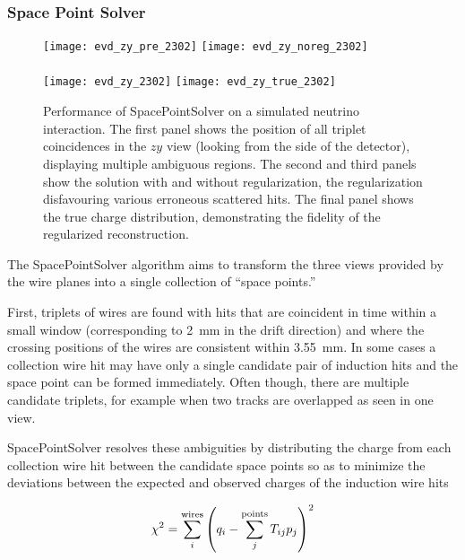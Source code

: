\subsubsection{Space Point Solver}

\begin{figure}
\texttt{[image: evd\_zy\_pre\_2302]}
\texttt{[image: evd\_zy\_noreg\_2302]}\\
\\
\texttt{[image: evd\_zy\_2302]}
\texttt{[image: evd\_zy\_true\_2302]}
\\

\caption[Event displays of SpacePointSolver performance]{Performance of SpacePointSolver on a simulated  neutrino interaction. The first panel shows the position of all triplet coincidences in the $zy$ view (looking from the side of the detector), displaying multiple ambiguous regions. The second and third panels show the solution with and without regularization, the regularization disfavouring various erroneous scattered hits. The final panel shows the true charge distribution, demonstrating %
the fidelity of the regularized reconstruction.}

\label{fig:spacepoint}
\end{figure}

The SpacePointSolver algorithm aims to transform the three \twod views provided by the wire planes into a single collection of \threed ``space points.''

First, triplets of wires are found with hits that are coincident in time within a small window (corresponding to \SI{2}{mm} in the drift direction) and where the crossing positions of the wires are consistent within \SI{3.55}{mm}. In some cases a collection wire hit may have only a single candidate pair of induction hits and the space point can be formed immediately. Often though, there are multiple candidate triplets, for example when two tracks are overlapped as seen in one view.

SpacePointSolver resolves these ambiguities by distributing the charge from each collection wire hit between the candidate space points so as to minimize the deviations between the expected and observed charges of the induction wire hits

\begin{equation}
\chi^2 = \sum_i^{\rm wires} \left(q_i - \sum_j^{\rm points}T_{ij}p_j\right)^2
\end{equation}

